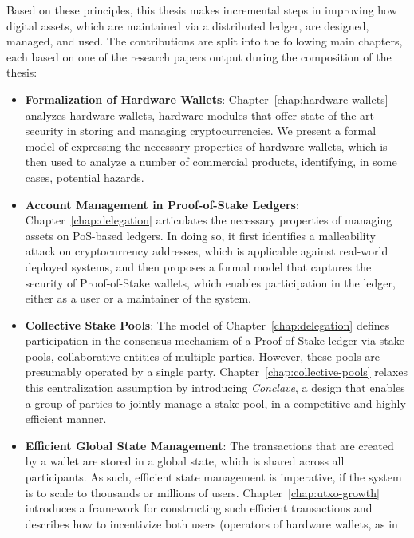 Based on these principles, this thesis makes incremental steps in improving how
digital assets, which are maintained via a distributed ledger, are designed,
managed, and used. The contributions are split into the following main
chapters, each based on one of the research papers output during the
composition of the thesis:
\begin{itemize}
    \item \textbf{Formalization of Hardware Wallets}:
        Chapter~\ref{chap:hardware-wallets} analyzes hardware wallets, \ie
        hardware modules that offer state-of-the-art security in storing and
        managing cryptocurrencies. We present a formal model of expressing the
        necessary properties of hardware wallets, which is then used to analyze
        a number of commercial products, identifying, in some cases, potential
        hazards.
    \item \textbf{Account Management in Proof-of-Stake Ledgers}:
        Chapter~\ref{chap:delegation} articulates the necessary properties of
        managing assets on PoS-based ledgers. In doing so, it first identifies
        a malleability attack on cryptocurrency addresses, which is applicable
        against real-world deployed systems, and then proposes a formal model
        that captures the security of Proof-of-Stake wallets, which enables
        participation in the ledger, either as a user or a maintainer of the
        system.
    \item \textbf{Collective Stake Pools}:
        The model of Chapter~\ref{chap:delegation} defines participation in the
        consensus mechanism of a Proof-of-Stake ledger via stake pools, \ie
        collaborative entities of multiple parties. However, these pools are
        presumably operated by a single party.
        Chapter~\ref{chap:collective-pools} relaxes this centralization
        assumption by introducing \emph{Conclave}, a design that enables a
        group of parties to jointly manage a stake pool, in a competitive and
        highly efficient manner.
    \item \textbf{Efficient Global State Management}:
        The transactions that are created by a wallet are stored in a global
        state, which is shared across all participants. As such, efficient
        state management is imperative, if the system is to scale to thousands
        or millions of users. Chapter~\ref{chap:utxo-growth} introduces a
        framework for constructing such efficient transactions and describes
        how to incentivize both users (\eg operators of hardware wallets, as in

\end{itemize}
